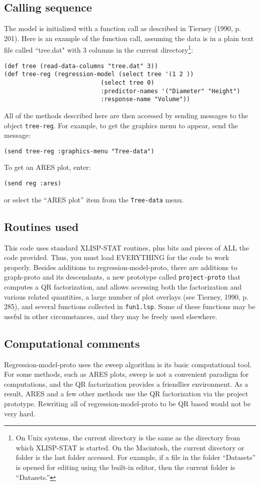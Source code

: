 \subsection {Calling sequence}
The model is initialized with a function call as
described in Tierney (1990, p. 201).  Here is an example of the function call,
assuming the data is in a plain text file called ``tree.dat" with 3
columns in the current directory\footnote{On Unix systems, the current
directory is the same as the directory from which XLISP-STAT is started.  On
the Macintosh, the current directory or folder is the last folder accessed.
For example, if a file in the folder ``Datasets'' is opened for editing 
using the built-in editor, then the current folder is ``Datasets.''}:
\begin{verbatim}
(def tree (read-data-columns "tree.dat" 3))
(def tree-reg (regression-model (select tree '(1 2 )) 
                           (select tree 0) 
                           :predictor-names '("Diameter" "Height")
                           :response-name "Volume"))
\end{verbatim}
All of the methods described here are then accessed by sending messages to the
object {\tt tree-reg}.  For example, to get the graphics menu to appear, 
send the message:
\begin{verbatim}
(send tree-reg :graphics-menu "Tree-data")
\end{verbatim}
To get an ARES plot, enter:
\begin{verbatim}
(send reg :ares)
\end{verbatim}
or select the ``ARES plot'' item from the {\tt Tree-data} menu.

\subsection{Routines used}
This code uses standard XLISP-STAT routines, 
plus bits and pieces of ALL the code provided.  Thus, you must load EVERYTHING
for the code to work properly.  Besides additions to regression-model-proto,
there are additions to graph-proto and its descendants, a new prototype called
{\tt project-proto} that computes a QR factorization, and allows accessing
both the factorization and various related quantities, a large number of
plot overlays (see Tierney, 1990, p. 285), and several functions collected in
{\tt fun1.lsp}.  Some of these functions may be useful in other
circumstances, and they may be freely used elsewhere.

\subsection{Computational comments}
Regression-model-proto uses the sweep algorithm 
is its basic computational tool.  For some methods, such as ARES plots, 
sweep is not a convenient paradigm for computations, and the QR factorization 
provides a friendlier environment.  As a result, ARES and a few other 
methods use the QR factorization via the project prototype.  Rewriting all of
regression-model-proto to be QR based would not be very hard.

